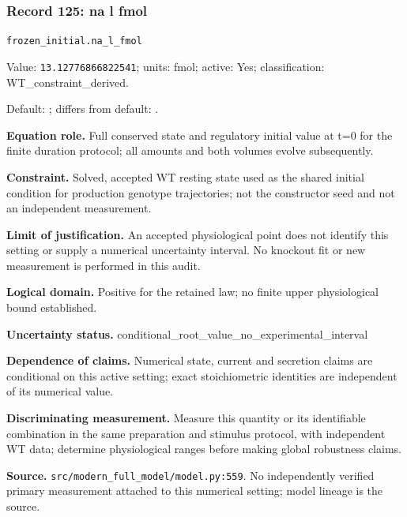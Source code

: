 \subsubsection*{Record 125: na l fmol}
{\small \nolinkurl{frozen_initial.na_l_fmol}\par

Value: \texttt{13.12776866822541}; units: fmol; active: Yes; classification: WT\_constraint\_derived.\par

Default: ; differs from default: .\par

\textbf{Equation role.} Full conserved state and regulatory initial value at t=0 for the finite duration protocol; all amounts and both volumes evolve subsequently.\par

\textbf{Constraint.} Solved, accepted WT resting state used as the shared initial condition for production genotype trajectories; not the constructor seed and not an independent measurement.\par

\textbf{Limit of justification.} An accepted physiological point does not identify this setting or supply a numerical uncertainty interval. No knockout fit or new measurement is performed in this audit.\par

\textbf{Logical domain.} Positive for the retained law; no finite upper physiological bound established.\par

\textbf{Uncertainty status.} conditional\_root\_value\_no\_experimental\_interval\par

\textbf{Dependence of claims.} Numerical state, current and secretion claims are conditional on this active setting; exact stoichiometric identities are independent of its numerical value.\par

\textbf{Discriminating measurement.} Measure this quantity or its identifiable combination in the same preparation and stimulus protocol, with independent WT data; determine physiological ranges before making global robustness claims.\par

\textbf{Source.} \nolinkurl{src/modern_full_model/model.py:559}. No independently verified primary measurement attached to this numerical setting; model lineage is the source.\par}

